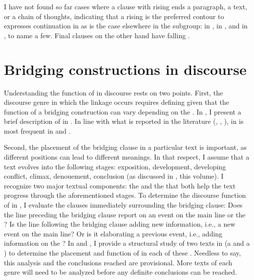\documentclass[output=paper]{LSP/langsci}
\begin{document}
I have not found so far cases where a clause with rising  ends a paragraph, a text, or a chain of thoughts, indicating that a rising  is the preferred contour to expresses continuation in  as is the case elsewhere in the  subgroup: in  \citep[][521]{Lichtenberk83}, in  \citep[][63]{Schokkin13}, and in  \citep[][38]{Schneider10}, to name a few. Final clauses on the other hand have falling . 

\section{Bridging constructions in discourse} 
\label{Gusec:Understanding}
Understanding the function of  in discourse rests on two points. First, the discourse genre in which the linkage occurs requires defining given that the function of a bridging construction can vary depending on the  \citep{devries.2005}. In , I present a brief description of  in . In line with what is reported in the literature (\citealt[][9]{longacre83},  \citealt[][365]{devries.2005}, \citealt[][274]{Thompson.et.al.2007}),  in  is most frequent in  and .   

Second, the placement of the bridging clause in a particular text is important, as different positions can lead to different meanings. In that respect, I assume that a text evolves into the following stages: exposition, development, developing conflict, climax, denouement, conclusion (as discussed in , this volume). I recognize two major textual components: the  and the  \citep[][14--17]{longacre83} that both help the text progress through the aforementioned stages. To determine the discourse function of  in , I evaluate the clauses immediately surrounding the bridging clause: Does the line preceding the bridging clause report on an event on the main line or the ? Is the line following the bridging clause adding new information, i.e., a new event on the main line? Or is it elaborating a previous event, i.e., adding information on the ? In  and , I provide a structural study of two texts in  (a  and a ) to determine the placement and function of  in each of these . Needless to say, this analysis and the conclusions reached are provisional. More texts of each genre will need to be analyzed before any definite conclusions can be reached.   
\end{document}
